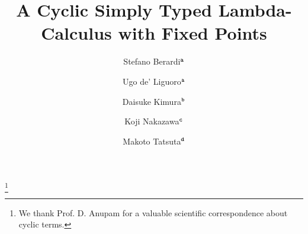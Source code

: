 \documentclass[twoside,11pt]{entics}
\begin{document}
\begin{frontmatter}

  \title{A Cyclic Simply Typed Lambda-Calculus with Fixed Points} 
 \thanks[ALL]{We thank Prof. D. Anupam for a valuable scientific correspondence about cyclic terms.}   %
  \author{Stefano Berardi$^{\tt a}$}	%
   \author{Ugo de' Liguoro$^{\tt a}$}		%
    \author{Daisuke Kimura$^{\tt b}$}
      \author{Koji Nakazawa$^{\tt c}$}
       \author{Makoto Tatsuta$^{\tt d}$}
   \address[a]{C.S. Dept., Turin University, Torino, Italy}  							
   \address[b]{Department of Information Science, Toho University, Japan} 
   \address[c]{Graduate School of Informatics, Nagoya University, Japan}
 \address[d]{National Institute of Informatics, Sokendai, Tokyo, Japan}
 
 


\end{frontmatter}
\end{document}
